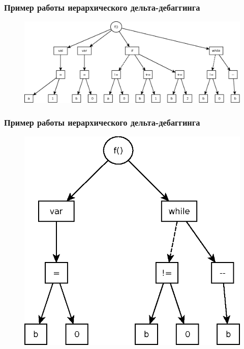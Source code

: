 \begin{frame}
	\frametitle{Пример работы иерархического дельта-дебаггинга}
	\begin{figure}
		\includegraphics[width=0.99\linewidth]{image/hdd1} 
	\end{figure}
\end{frame}

\begin{frame}
	\frametitle{Пример работы иерархического дельта-дебаггинга}
	\begin{figure}
		\includegraphics[width=0.5\linewidth]{image/hdd2} 
	\end{figure}
\end{frame}


%


